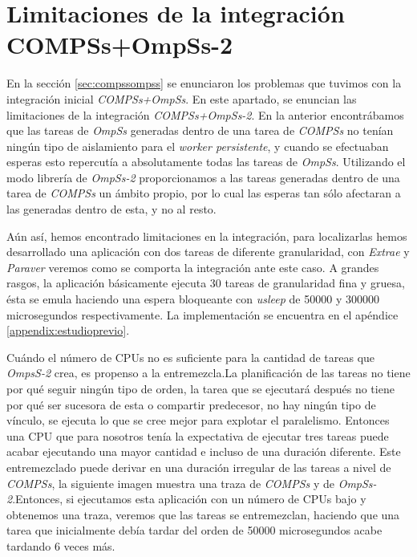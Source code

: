 
\section{Limitaciones de la integración COMPSs+OmpSs-2}
\label{sec:estudiopreviorend}

En la sección \ref{sec:compssompss} se enunciaron los problemas que tuvimos con la integración inicial \textit{COMPSs+OmpSs}. En este apartado, se enuncian las limitaciones de la integración \textit{COMPSs+OmpSs-2}. En la anterior encontrábamos que las tareas de \textit{OmpSs} generadas dentro de una tarea de \textit{COMPSs} no tenían ningún tipo de aislamiento para el \textit{worker persistente}, y cuando se efectuaban esperas esto repercutía a absolutamente todas las tareas de \textit{OmpSs}. Utilizando el modo librería de \textit{OmpSs-2} proporcionamos a las tareas generadas dentro de una tarea de \textit{COMPSs} un ámbito propio, por lo cual las esperas tan sólo afectaran a las generadas dentro de esta, y no al resto.

\par\bigskip

Aún así, hemos encontrado limitaciones en la integración, para localizarlas hemos desarrollado una aplicación con dos tareas de diferente granularidad, con \textit{Extrae} y \textit{Paraver} veremos como se comporta la integración ante este caso. A grandes rasgos, la aplicación básicamente ejecuta 30 tareas de granularidad fina y gruesa, ésta se emula haciendo una espera bloqueante con \textit{usleep} de 50000 y 300000 microsegundos respectivamente. La implementación se encuentra en el apéndice \ref{appendix:estudioprevio}.

\par\bigskip

Cuándo el número de CPUs no es suficiente para la cantidad de tareas que \textit{OmpsS-2} crea, es propenso a la entremezcla.La planificación de las tareas no tiene por qué seguir ningún tipo de orden, la tarea que se ejecutará después no tiene por qué ser sucesora de esta o compartir predecesor, no hay ningún tipo de vínculo, se ejecuta lo que se cree mejor para explotar el paralelismo. Entonces una CPU que para nosotros tenía la expectativa de ejecutar tres tareas puede acabar ejecutando una mayor cantidad e incluso de una duración diferente. Este entremezclado puede derivar en una duración irregular de las tareas a nivel de \textit{COMPSs}, la siguiente imagen muestra una traza de \textit{COMPSs} y de \textit{OmpSs-2}.Entonces, si ejecutamos esta aplicación con un número de CPUs bajo y obtenemos una traza, veremos que las tareas se entremezclan, haciendo que una tarea que inicialmente debía tardar del orden de 50000 microsegundos acabe tardando 6 veces más. 


